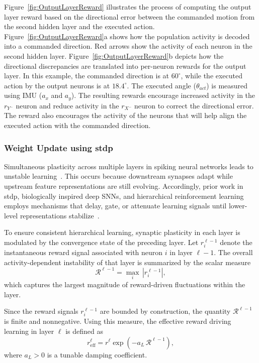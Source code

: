 Figure~\ref{fig:OutputLayerReward} illustrates the process of computing the output layer reward based on the directional error between the commanded motion from the second hidden layer and the executed action. Figure~\ref{fig:OutputLayerReward}a shows how the population activity is decoded into a commanded direction. Red arrows show the activity of each neuron in the second hidden layer. Figure~\ref{fig:OutputLayerReward}b depicts how the directional discrepancies are translated into per-neuron rewards for the output layer. In this example, the commanded direction is at \(60^\circ\), while the executed action by the output neurons is at \(18.4^\circ\). The executed angle ($\theta_{act}$) is measured using IMU ($a_{x}$ and $a_{y}$). The resulting rewards encourage increased activity in the \(r_{Y^-}\) neuron and reduce activity in the \(r_{X^-}\) neuron to correct the directional error. The reward also encourages the activity of the neurons that will help align the executed action with the commanded direction.

\subsubsection{Weight Update using \ac{stdp}}
\label{subsubsec:stdp_weight_update}

Simultaneous plasticity across multiple layers in spiking neural networks leads to unstable learning~\cite{wilmes2023dendrites}. This occurs because downstream synapses adapt while upstream feature representations are still evolving. Accordingly, prior work in \ac{stdp}, biologically inspired deep SNNs, and hierarchical reinforcement learning employs mechanisms that delay, gate, or attenuate learning signals until lower-level representations stabilize~\cite{fremaux2016neuromodulated}. 

To ensure consistent hierarchical learning, synaptic plasticity in each layer is modulated
by the convergence state of the preceding layer.
Let \(r^{\ell-1}_i\) denote the instantaneous reward signal associated with neuron \(i\) in
layer \(\ell-1\).
The overall activity-dependent instability of that layer is summarized by the scalar
measure
\begin{equation}
\mathcal{R}^{\ell-1} = \max_i \, |r^{\ell-1}_i|,
\end{equation}
which captures the largest magnitude of reward-driven fluctuations within the layer.

Since the reward signals \(r^{\ell-1}_i\) are bounded by construction, the quantity
\(\mathcal{R}^{\ell-1}\) is finite and nonnegative.
Using this measure, the effective reward driving learning in layer \(\ell\) is defined as
\begin{equation}
r^{\ell}_{\mathrm{eff}}
=
r^{\ell} \exp\!\left(-a_L \, \mathcal{R}^{\ell-1}\right),
\label{effectiveReward}
\end{equation}
where \(a_L > 0\) is a tunable damping coefficient.

